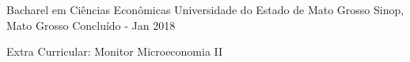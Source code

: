 \documentclass[11pt, letter]{awesome-cv}
\begin{document}
	\makecvheader
\vspace{-1mm}
\vspace{-3mm}
\begin{cventries}
	\cventry
	{Bacharel em Ciências Econômicas}
	{Universidade do Estado de Mato Grosso\vspace{-2mm}}
	{Sinop, Mato Grosso\vspace{-2mm}}
	{Concluído - Jan 2018}
	{
		\begin{cvitems}
			\vspace{-2mm}
			\item {Extra Curricular: Monitor Microeconomia II\vspace{-2mm}}
		\end{cvitems}
	}
\end{cventries}
\end{document}
